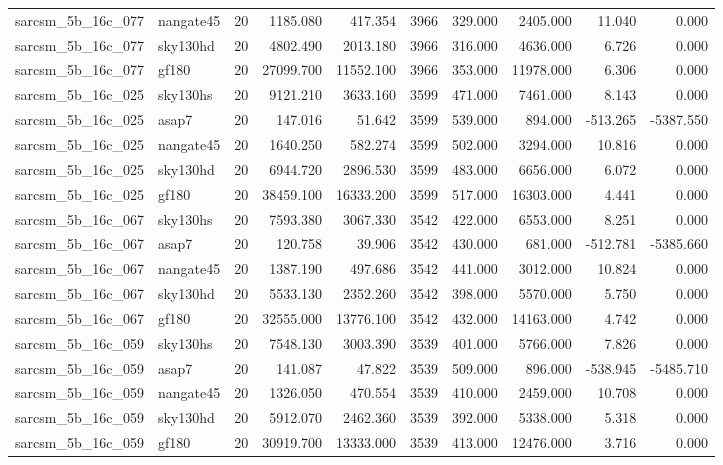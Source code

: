 \begin{longtable}{llrrrrrrrr}
sarcsm\_5b\_16c\_077 & nangate45 & 20 & 1185.080 & 417.354 & 3966 & 329.000 & 2405.000 & 11.040 & 0.000 \\
sarcsm\_5b\_16c\_077 & sky130hd & 20 & 4802.490 & 2013.180 & 3966 & 316.000 & 4636.000 & 6.726 & 0.000 \\
sarcsm\_5b\_16c\_077 & gf180 & 20 & 27099.700 & 11552.100 & 3966 & 353.000 & 11978.000 & 6.306 & 0.000 \\
sarcsm\_5b\_16c\_025 & sky130hs & 20 & 9121.210 & 3633.160 & 3599 & 471.000 & 7461.000 & 8.143 & 0.000 \\
sarcsm\_5b\_16c\_025 & asap7 & 20 & 147.016 & 51.642 & 3599 & 539.000 & 894.000 & -513.265 & -5387.550 \\
sarcsm\_5b\_16c\_025 & nangate45 & 20 & 1640.250 & 582.274 & 3599 & 502.000 & 3294.000 & 10.816 & 0.000 \\
sarcsm\_5b\_16c\_025 & sky130hd & 20 & 6944.720 & 2896.530 & 3599 & 483.000 & 6656.000 & 6.072 & 0.000 \\
sarcsm\_5b\_16c\_025 & gf180 & 20 & 38459.100 & 16333.200 & 3599 & 517.000 & 16303.000 & 4.441 & 0.000 \\
sarcsm\_5b\_16c\_067 & sky130hs & 20 & 7593.380 & 3067.330 & 3542 & 422.000 & 6553.000 & 8.251 & 0.000 \\
sarcsm\_5b\_16c\_067 & asap7 & 20 & 120.758 & 39.906 & 3542 & 430.000 & 681.000 & -512.781 & -5385.660 \\
sarcsm\_5b\_16c\_067 & nangate45 & 20 & 1387.190 & 497.686 & 3542 & 441.000 & 3012.000 & 10.824 & 0.000 \\
sarcsm\_5b\_16c\_067 & sky130hd & 20 & 5533.130 & 2352.260 & 3542 & 398.000 & 5570.000 & 5.750 & 0.000 \\
sarcsm\_5b\_16c\_067 & gf180 & 20 & 32555.000 & 13776.100 & 3542 & 432.000 & 14163.000 & 4.742 & 0.000 \\
sarcsm\_5b\_16c\_059 & sky130hs & 20 & 7548.130 & 3003.390 & 3539 & 401.000 & 5766.000 & 7.826 & 0.000 \\
sarcsm\_5b\_16c\_059 & asap7 & 20 & 141.087 & 47.822 & 3539 & 509.000 & 896.000 & -538.945 & -5485.710 \\
sarcsm\_5b\_16c\_059 & nangate45 & 20 & 1326.050 & 470.554 & 3539 & 410.000 & 2459.000 & 10.708 & 0.000 \\
sarcsm\_5b\_16c\_059 & sky130hd & 20 & 5912.070 & 2462.360 & 3539 & 392.000 & 5338.000 & 5.318 & 0.000 \\
sarcsm\_5b\_16c\_059 & gf180 & 20 & 30919.700 & 13333.000 & 3539 & 413.000 & 12476.000 & 3.716 & 0.000 \\

\end{longtable}
